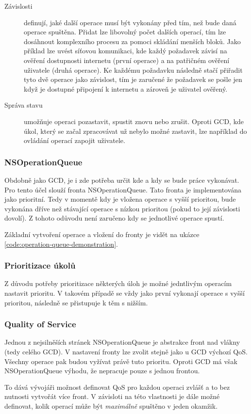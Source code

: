 \begin{description}
  \item[Závislosti] definují, jaké další operace musí být vykonány před tím, než bude daná operace spuštěna.
  Přidat lze libovolný počet dalších operací, tím lze dosáhnout komplexního procesu za pomoci skládání menších bloků.
  Jako příklad lze uvést síťovou komunikaci, kde každý požadavek závisí na ověření dostupnosti internetu (první operace) a na patřičném ověření uživatele (druhá operace).
  Ke každému požadavku následně stačí přiřadit tyto dvě operace jako závislost, tím je zaručené že požadavek se pošle jen když je dostupné připojení k internetu a zároveň je uživatel ověřený.
  \item[Správa stavu] umožňuje operaci pozastavit, spustit znovu nebo zrušit.
  Oproti GCD, kde úkol, který se začal zpracovávat už nebylo možné zastavit, lze například do ovládání operací zapojit uživatele.
\end{description}

\subsubsection{NSOperationQueue}

Obdobně jako GCD, je i zde potřeba určit kde a kdy se bude práce vykonávat.
Pro tento účel slouží fronta NSOperationQueue.
Tato fronta je implementována jako prioritní.
Tedy v momentě kdy je vložena operace s vyšší prioritou, bude vykonána dříve než stávající operace s nízkou prioritou (pokud to její závislosti dovolí).
Z tohoto odůvodu není zaručeno kdy se jednotlivé operace spustí.

Základní vytvoření operace a vložení do fronty je vidět na ukázce \ref{code:operation-queue-demonstration}.


\subsubsection{Prioritizace úkolů}

Z důvodu potřeby prioritizace některých úloh je možné jedntlivým operacím nastavit prioritu.
V takovém případě se vždy jako první vykonají operace s vyšší prioritou, následně se přistupuje k těm s nižším.

\subsubsection{Quality of Service}

Jednou z nejsilněších stránek NSOperationQueue je abstrakce front nad vlákny (tedy celého GCD).
V nastavení fronty lze zvolit stejně jako u GCD výchozí QoS.
Všechny operace pak budou vyžívat právě tuto prioritu.
Oproti GCD má však NSOperationQueue výhodu, že nepracuje pouze s jednou frontou.

To dává vývojáři možnost definovat QoS pro každou operaci zvlášť a to bez nutnosti vytvořát více front.
V závisloti na této vlastnosti je dále možné definovat, kolik operací může být \textit{maximálně} spuštěno v jeden okamžik.
